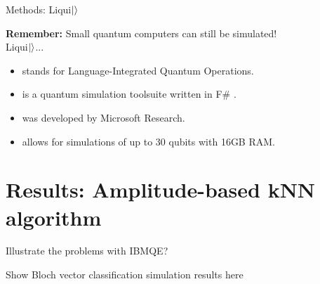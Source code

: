 \documentclass[10pt]{beamer}
\begin{document}
{
\begin{frame}[fragile]{Methods: Liqui$\ket{}$}

\textbf{Remember:} Small quantum computers can still be simulated!\\
\vspace{0.5cm}
Liqui$\ket{}$...
\begin{itemize}
\item stands for Language-Integrated Quantum Operations. 
\item is a quantum simulation toolsuite written in F\# .
\item was developed by Microsoft Research.
\item allows for simulations of up to 30 qubits with 16GB RAM.

\end{itemize}

\end{frame}
}

\section{Results: Amplitude-based kNN algorithm}

{
\begin{frame}[fragile]{}

Illustrate the problems with IBMQE?

Show Bloch vector classification simulation results here

\end{frame}
}
\end{document}
